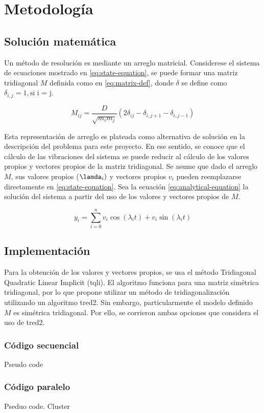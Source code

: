 \section{Metodología}
\subsection{Solución matemática}

Un método de resolución es mediante un arreglo matricial. Considerese el sistema de ecuaciones mostrado en \ref{eq:state-equation}, se puede formar una matriz tridiagonal $M$ definida como en \ref{eq:matrix-def}, donde $\delta$ se define como $\delta_{i,j} = 1, \text{si i = j}$.

\begin{equation}
    M_{ij} = \frac{D}{\sqrt{m_i m_j}} (2 \delta_{ij} - \delta_{i, j+1} - \delta_{i, j-1}) 
    \label{eq:matrix-def}
\end{equation}

Esta representación de arreglo es plateada como alternativa de solución en la descripción del problema para este proyecto. En ese sentido, se conoce que el cálculo de las vibraciones del sistema se puede reducir al cálculo de los valores propios y vectores propios de la matriz tridiagonal. Se asume que dado el arreglo $M$, sus valores propios ($\lamda_i)$ y vectores propios $v_i$ pueden reemplazarse directamente en \ref{eq:state-equation}. Sea la ecuación \ref{eq:analytical-equation} la solución del sistema a partir del uso de los valores y vectores propios de $M$.

\begin{equation}
    y_{i} = \sum^{n}_{i=0} v_i \cos(\lambda_i t ) + v_i \sin(\lambda_i t )  
    \label{eq:analyical-solution}
\end{equation}

\subsection{Implementación}
Para la obtención de los valores y vectores propios, se usa el método Tridiagonal Quadratic Linear Implicit (tqli). El algoritmo funciona para una matriz simétrica tridiagonal, por lo que propone utilizar un método de tridiagonalización utilizando un algoritmo tred2. Sin embargo, particularmente el modelo definido $M$ es simétrica tridiagonal. Por ello, se corrieron ambas opciones que considera el uso de tred2. 

\subsubsection{Código secuencial}
Pseudo code 

\subsubsection{Código paralelo}
Pseduo code. Cluster